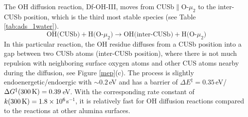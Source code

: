 \documentclass[11pt,DIV=13,BCOR=5mm,a4paper,headinclude]{scrbook}
\begin{document}


The OH diffusion reaction, Df-OH-III, moves from CUSb$\parallel$O-$\mu_2$ to the inter-CUSb position, which is the third most stable species (see Table \ref{tab:ads_1water}).
\begin{equation}
 \text{OH(CUSb)} + \text{H(O-$\mu_2$)} \rightarrow \text{OH(inter-CUSb)} + \text{H(O-$\mu_2$)} \tag{Df-OH-III}
     \label{diffOHIII}
\end{equation}
In this particular reaction, the OH residue diffuses from a CUSb position into a gap between two CUSb atoms (inter-CUSb position), where there is not much repulsion with neighboring surface oxygen atoms and other CUS atoms nearby during the diffusion, see Figure \ref{mep}(c).
The process is slightly endoenergetic/endoergic with $\sim 0.2\,$eV and has a barrier of $\Delta E^\ddagger=0.35\,$eV/$\Delta G^\ddagger(\textrm{300\,K})=0.39\,$eV.
With the corresponding rate constant of $k(\textrm{300\,K})=1.8\times 10^6$s$^{-1}$, it is relatively fast for OH diffusion reactions compared to the reactions at other alumina surfaces\cite{WirthJPCC2012,Wirth2016}.
\end{document}
